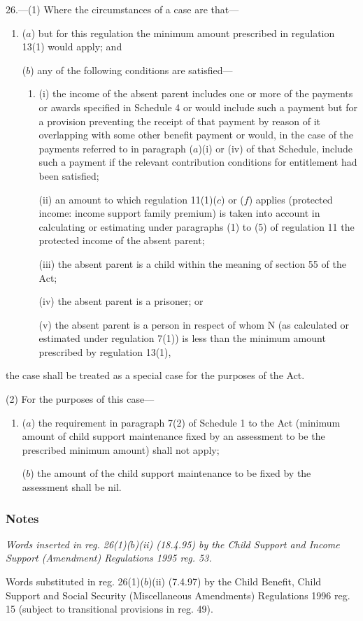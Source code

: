 \documentclass[a4paper]{article}
\newcommand\amendment[1]{\subsubsection*{Notes}{\itshape\frenchspacing\footnotesize #1 \par\goodbreak}}
\begin{document}
26.—(1) Where the circumstances of a case are that—
\begin{enumerate}\item[]
($a$) but for this regulation the minimum amount prescribed in regulation 13(1) would apply; and

($b$) any of the following conditions are satisfied—
\begin{enumerate}\item[]
(i) the income of the absent parent includes one or more of the payments or awards specified in Schedule 4 or would include such a payment but for a provision preventing the receipt of that payment by reason of it overlapping with some other benefit payment or would, in the case of the payments referred to in paragraph ($a$)(i) or (iv) of that Schedule, include such a payment if the relevant contribution conditions for entitlement had been satisfied;

(ii) an amount to which regulation 
11(1)($c$) or ($f$)  %
applies (protected income: income support family premium) is taken into account in calculating or estimating 
under paragraphs (1) to (5) of regulation 11  %
the protected income of the absent parent;

(iii) the absent parent is a child within the meaning of section 55 of the Act;

(iv) the absent parent is a prisoner; or

(v) the absent parent is a person in respect of whom N (as calculated or estimated under regulation 7(1)) is less than the minimum amount prescribed by regulation 13(1),
\end{enumerate}
\end{enumerate}
the case shall be treated as a special case for the purposes of the Act.

(2) For the purposes of this case—
\begin{enumerate}\item[]
($a$) the requirement in paragraph 7(2) of Schedule 1 to the Act (minimum amount of child support maintenance fixed by an assessment to be the prescribed minimum amount) shall not apply;

($b$) the amount of the child support maintenance to be fixed by the assessment shall be nil.
\end{enumerate}

\amendment{
Words inserted in reg. 26(1)($b$)(ii) (18.4.95) by the Child Support and Income Support (Amendment) Regulations 1995 reg. 53.

Words substituted in reg. 26(1)($b$)(ii) (7.4.97) by the Child Benefit, Child Support and Social Security (Miscellaneous Amendments) Regulations 1996 reg. 15 (subject to transitional provisions in reg. 49).
}
\end{document}
